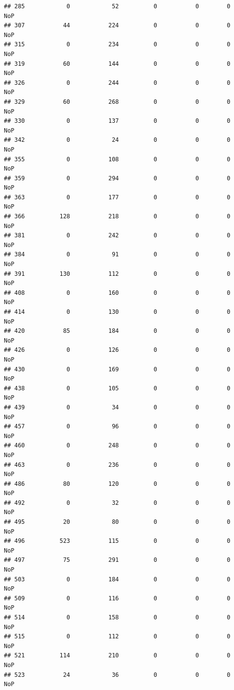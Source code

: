 \documentclass[]{article}
\begin{document}
\begin{verbatim}
## 285            0            52          0           0        0    NoP
## 307           44           224          0           0        0    NoP
## 315            0           234          0           0        0    NoP
## 319           60           144          0           0        0    NoP
## 326            0           244          0           0        0    NoP
## 329           60           268          0           0        0    NoP
## 330            0           137          0           0        0    NoP
## 342            0            24          0           0        0    NoP
## 355            0           108          0           0        0    NoP
## 359            0           294          0           0        0    NoP
## 363            0           177          0           0        0    NoP
## 366          128           218          0           0        0    NoP
## 381            0           242          0           0        0    NoP
## 384            0            91          0           0        0    NoP
## 391          130           112          0           0        0    NoP
## 408            0           160          0           0        0    NoP
## 414            0           130          0           0        0    NoP
## 420           85           184          0           0        0    NoP
## 426            0           126          0           0        0    NoP
## 430            0           169          0           0        0    NoP
## 438            0           105          0           0        0    NoP
## 439            0            34          0           0        0    NoP
## 457            0            96          0           0        0    NoP
## 460            0           248          0           0        0    NoP
## 463            0           236          0           0        0    NoP
## 486           80           120          0           0        0    NoP
## 492            0            32          0           0        0    NoP
## 495           20            80          0           0        0    NoP
## 496          523           115          0           0        0    NoP
## 497           75           291          0           0        0    NoP
## 503            0           184          0           0        0    NoP
## 509            0           116          0           0        0    NoP
## 514            0           158          0           0        0    NoP
## 515            0           112          0           0        0    NoP
## 521          114           210          0           0        0    NoP
## 523           24            36          0           0        0    NoP

\end{verbatim}
\end{document}
